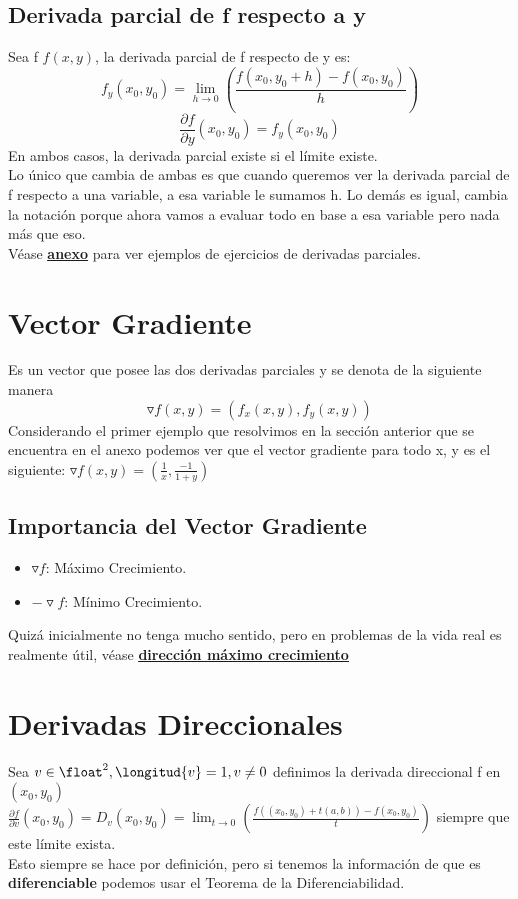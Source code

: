 \documentclass[10pt,a4paper]{article}
\begin{document}
\subsection*{Derivada parcial de f respecto a y}
Sea f $f(x,y)$, la derivada parcial de f respecto de y es: 
\[f_{y}(x_{0}, y_{0}) = \lim_{h \to 0} \left(\frac{f(x_{0}, y_{0} + h) - f(x_{0}, y_{0})}{h} \right)\]
\[\frac{\partial f}{\partial y}(x_{0}, y_{0}) = f_{y}(x_{0}, y_{0})\]
En ambos casos, la derivada parcial existe si el límite existe. \\
Lo único que cambia de ambas es que cuando queremos ver la derivada parcial de f respecto a una variable, a esa variable le sumamos h. Lo demás es igual, cambia la notación porque ahora vamos a evaluar todo en base a esa variable pero nada más que eso. \\
Véase \hyperref[subsec:derivadas_parciales]{\underline{\textbf{anexo}}} para ver ejemplos de ejercicios de derivadas parciales.
\section*{Vector Gradiente}
Es un vector que posee las dos derivadas parciales y se denota de la siguiente manera
\[\triangledown f(x,y) = (f_{x}(x,y), f_{y}(x,y))\]
Considerando el primer ejemplo que resolvimos en la sección anterior que se encuentra en el anexo podemos ver que el vector gradiente para todo x, y es el siguiente: $\triangledown f(x, y) = (\frac{1}{x}, \frac{-1}{1+y})$
\subsection*{Importancia del Vector Gradiente}
\begin{itemize}
    \item $\triangledown f$: Máximo Crecimiento.
    \item $- \triangledown f$: Mínimo Crecimiento.
\end{itemize}
Quizá inicialmente no tenga mucho sentido, pero en problemas de la vida real es realmente útil, véase \hyperref[subsec:direccion_maximo_crecimiento]{\underline{\textbf{dirección máximo crecimiento}}}

\section*{Derivadas Direccionales}
Sea $v \in \float^{2}, \longitud{v} = 1, v \neq 0$ definimos la derivada direccional f en $(x_{0}, y_{0})$ \\ 
$\frac{\partial f}{\partial v}(x_{0}, y_{0}) = D_{v}(x_{0}, y_{0}) = \lim_{t \to 0} \left(\frac{f((x_{0}, y_{0}) + t(a, b)) - f(x_{0}, y_{0})}{t} \right) $ siempre que este límite exista. \\
Esto siempre se hace por definición, pero si tenemos la información de que es \textbf{diferenciable} podemos usar el Teorema de la Diferenciabilidad. 
\end{document}
